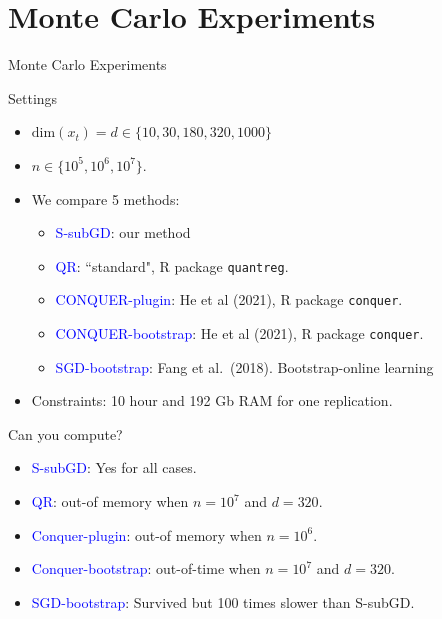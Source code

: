 \documentclass[beamer, t]{beamer}
\newcommand{\bit}{\begin{itemize}}
\newcommand{\eit}{\end{itemize}}
\newcommand{\tcb}{\textcolor{blue}}
\begin{document}
\section{Monte Carlo Experiments}

\begin{frame}
	\vfill
	\centering
	\LARGE{Monte Carlo Experiments}
	\vfill
\end{frame}


 
\begin{frame}{Settings} 
	\begin{itemize}
		\item $\mbox{dim}(x_t)=d\in\{10, 30, 180, 320, 1000\}$
		\item $n\in\{10^5, 10^6,10^7\}.$
		\item We compare 5 methods:
		
		\bit
			\item \tcb{S-subGD}: our method
			
			\item \tcb{QR}: ``standard", R package \texttt{quantreg}. 
			
			\item \tcb{CONQUER-plugin}: He et al (2021), R package
			\texttt{conquer}.
			
			\item \tcb{CONQUER-bootstrap}: He et al (2021), R package
			\texttt{conquer}.
			
			\item \tcb{SGD-bootstrap}: Fang et al.~(2018). Bootstrap-online learning
			
			
		\eit
		
		\medskip
		\item Constraints: 10 hour and 192 Gb RAM for one replication.
	\end{itemize}
	
	
\end{frame}



\begin{frame}{Can you compute?} 
	
	\bit
		
		\item \tcb{S-subGD}: Yes for all cases.
		
		\item \tcb{QR}:  out-of memory when $n= 10^7$ and $d=320$.
		
		\item \tcb{Conquer-plugin}:  out-of memory when $n=10^6$.
		
		\item \tcb{Conquer-bootstrap}: out-of-time when $n= 10^7$ and $d=320$.
		
		\item \tcb{SGD-bootstrap}: Survived but 100 times slower than S-subGD.
		
		
	\eit
	
	
	
\end{frame}
\end{document}
